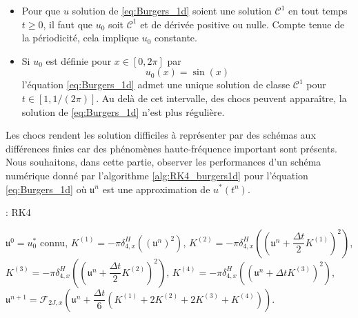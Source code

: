 \begin{remarque}
\begin{itemize}
\item Pour que $u$ solution de \eqref{eq:Burgers_1d} soient une solution $\mathcal{C}^1$ en tout temps $t \geq 0$, il faut que $u_0$ soit $\mathcal{C}^1$ et de dérivée positive ou nulle. Compte tenue de la périodicité, cela implique $u_0$ constante.

\item Si $u_0$ est définie pour $x \in [0, 2 \pi]$ par 
\begin{equation}
u_0(x) = \sin (x)
\label{eq:burgers_expemple2}
\end{equation}
l'équation \eqref{eq:Burgers_1d} admet une unique solution de classe $\mathcal{C}^1$ pour $t \in [1, 1/(2\pi)]$. Au delà de cet intervalle, des chocs peuvent apparaître, la solution de \eqref{eq:Burgers_1d} n'est plus régulière.
\end{itemize}
\end{remarque}


Les chocs rendent les solution difficiles à représenter par des schémas aux différences finies car des phénomènes haute-fréquence important sont présents. Nous souhaitons, dans cette partie, observer les performances d'un schéma numérique donné par l'algorithme \ref{alg:RK4_burgers1d} pour l'équation \eqref{eq:Burgers_1d} où $\mathfrak{u}^n$ est une approximation de $u^*(t^n)$.

\begin{center}
\begin{minipage}[H]{12cm}
  \begin{algorithm}[H]
    \caption{: RK4}\label{alg:RK4_burgers1d}
    \begin{algorithmic}[1]
    \State $\mathfrak{u}^0 = u_0^*$ connu,
             \State  $K^{(1)} = - \pi \delta_{4,x}^H \left(\left( \mathfrak{u}^n \right)^2\right)$,
             \State  $K^{(2)} = - \pi \delta_{4,x}^H \left(\left( \mathfrak{u}^n + \dfrac{\Delta t}{2} K^{(1)}\right)^2\right)$,
             \State  $K^{(3)} = - \pi \delta_{4,x}^H \left(\left( \mathfrak{u}^n + \dfrac{\Delta t}{2} K^{(2)}\right)^2\right)$,
             \State  $K^{(4)} = - \pi \delta_{4,x}^H \left(\left( \mathfrak{u}^n + \Delta t K^{(3)}\right)^2\right)$,  
             \State  $\mathfrak{u}^{n+1} = \mathcal{F}_{2J,x}\left( \mathfrak{u}^n  + \dfrac{\Delta t}{6} \left( K^{(1)} + 2 K^{(2)} + 2 K^{(3)} + K^{(4)} \right) \right)$.
            \EndFor
    \end{algorithmic}
    \end{algorithm}
\end{minipage}
\end{center}

